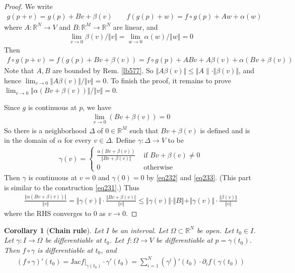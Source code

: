 \documentclass[12pt,b5paper,notitlepage]{article}
\theoremstyle{definition}
\theoremstyle{plain}
\newtheorem{co}[df]{Corollary}
\newcommand{\Rbb}{\mathbb R}
\newcommand{\Jac}{\mathrm{Jac}}
\newcommand{\dps}{\displaystyle}
\numberwithin{equation}{section}
\begin{document}
\begin{proof}
We write
\begin{align*}
g(p+v)=g(p)+Bv+\beta(v)\qquad f(g(p)+w)=f\circ g(p)+Aw+\alpha(w)
\end{align*}
where $A:\Rbb^N\rightarrow V$ and $B:\Rbb^M\rightarrow\Rbb^N$ are linear, and
\begin{align}
\lim_{v\rightarrow 0}\beta(v)/\Vert v\Vert=\lim_{w\rightarrow 0}\alpha(w)/\Vert w\Vert=0  \label{eq232}
\end{align}
Then
\begin{align*}
f\circ g(p+v)=f(g(p)+Bv+\beta(v))=f\circ g(p)+ABv+A\beta(v)+\alpha(Bv+\beta(v))
\end{align*}
Note that $A,B$ are bounded by Rem. \ref{lb577}. So $\Vert A\beta(v)\Vert\leq\Vert A\lVert \cdot\Vert\beta(v)\Vert$, and hence $\lim_{v\rightarrow 0}\Vert A\beta(v)\Vert/\Vert v\Vert=0$. To finish the proof, it remains to prove $\lim_{v\rightarrow0}\Vert \alpha(Bv+\beta(v))\Vert/\Vert v\Vert=0$.

Since $g$ is continuous at $p$, we have
\begin{align}
\lim_{v\rightarrow0} (Bv+\beta(v))=0 \label{eq233}
\end{align}
So there is a neighborhood $\Delta$ of $0\in\Rbb^M$ such that $Bv+\beta(v)$ is defined and is in the domain of $\alpha$ for every $v\in \Delta$. Define $\gamma:\Delta\rightarrow V$ to be
\begin{align*}
\gamma(v)=\left\{
\begin{array}{cc}
\dps\frac{\alpha(Bv+\beta(v))}{\Vert Bv+\beta(v)\Vert}&\text{ if }Bv+\beta(v)\neq0\\[2ex]
0&\text{ otherwise}
\end{array}
\right.
\end{align*}
Then $\gamma$ is continuous at $v=0$ and $\gamma(0)=0$ by \eqref{eq232} and \eqref{eq233}. (This part is similar to the construction \eqref{eq231}.) Thus
\begin{align*}
\frac{\Vert\alpha(Bv+\beta(v))\Vert}{\Vert v\Vert}=\Vert\gamma(v)\Vert\cdot\frac{\Vert Bv+\beta(v)\Vert}{\Vert v\Vert}\leq \Vert\gamma(v)\Vert\cdot\Vert B\Vert+\Vert \gamma(v)\Vert\cdot \frac{\Vert\beta(v)\Vert}{\Vert v\Vert}
\end{align*}
where the RHS converges to $0$ as $v\rightarrow 0$.
\end{proof}




\begin{co}[\textbf{Chain rule}]\label{lb581}
Let $I$ be an interval. Let $\Omega\subset\Rbb^N$ be open. Let $t_0\in I$. Let $\gamma:I\rightarrow\Omega$ be differentiable at $t_0$. Let $f:\Omega\rightarrow V$ be differentiable at $p=\gamma(t_0)$. Then $f\circ\gamma$ is differentiable at $t_0$, and 
\begin{align}
(f\circ\gamma)'(t_0)=\Jac f|_{\gamma(t_0)}\cdot \gamma'(t_0)=\sum_{i=1}^N (\gamma^i)'(t_0)\cdot\partial_i f(\gamma(t_0))
\end{align}
\end{co}
\end{document}
